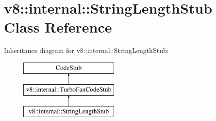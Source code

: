 \hypertarget{classv8_1_1internal_1_1_string_length_stub}{}\section{v8\+:\+:internal\+:\+:String\+Length\+Stub Class Reference}
\label{classv8_1_1internal_1_1_string_length_stub}
Inheritance diagram for v8\+:\+:internal\+:\+:String\+Length\+Stub\+:\begin{figure}[H]
\begin{center}
\leavevmode
\includegraphics[height=3.000000cm]{classv8_1_1internal_1_1_string_length_stub}
\end{center}
\end{figure}
